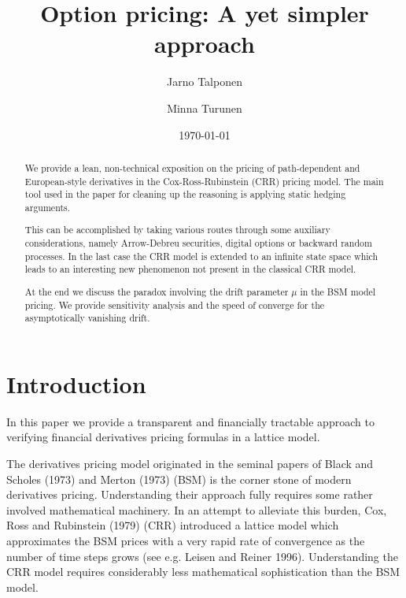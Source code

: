 \documentclass{amsart}
\theoremstyle{definition}
\theoremstyle{remark}
\numberwithin{equation}{section}
\newcommand{\1}{\boldsymbol{1}}
\begin{document}
%
\title[Option pricing simplified]{Option pricing: A yet simpler approach}



\author{Jarno Talponen \and Minna Turunen}
\address{University of Eastern Finland, Department of Physics and Mathematics, Box 111, FI-80101 Joensuu, Finland}




\date{\today}


\begin{abstract}
We provide a lean, non-technical exposition on the pricing of path-dependent and European-style derivatives in the Cox-Ross-Rubinstein (CRR) pricing model. The main tool used in the paper for cleaning up the reasoning is applying static hedging arguments.

This can be accomplished by taking various routes through some auxiliary considerations, namely Arrow-Debreu securities, digital options or backward random processes. In the last case the CRR model is extended to an infinite state space which leads to an interesting new phenomenon not present in the classical CRR model. 

At the end we discuss the paradox involving the drift parameter $\mu$ in the BSM model pricing. We provide sensitivity analysis and the speed of converge for the asymptotically
vanishing drift.
\end{abstract}

\maketitle


\section{Introduction}

In this paper we provide a transparent and financially tractable approach to verifying financial derivatives 
pricing formulas in a lattice model. 

The derivatives pricing model originated in the seminal papers of Black and Scholes (1973) and Merton (1973) (BSM) is the corner stone of modern derivatives pricing. Understanding their approach fully requires some rather involved mathematical machinery. In an attempt to alleviate this burden, Cox, Ross and Rubinstein (1979) (CRR) introduced a lattice model which approximates the BSM prices with a very rapid rate of convergence as the number of time steps grows (see e.g. Leisen and Reiner 1996). Understanding the CRR model requires considerably less mathematical sophistication than the BSM model.
\end{document}
